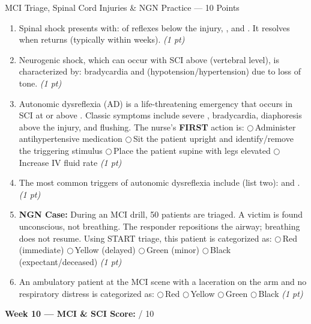 \documentclass[11pt,letterpaper]{article}
\newcommand{\blank}[1][3cm]{\underline{\hspace{#1}}}
\begin{document}
\begin{diagbox}{MCI Triage, Spinal Cord Injuries \& NGN Practice --- 10 Points}
\begin{enumerate}[leftmargin=1.5em, label=\textbf{\arabic*.},start=101]
  \item Spinal shock presents with: \blank[3cm] of reflexes below the injury,
        \blank[3cm], and \blank[3cm].  It resolves when
        \blank[4cm] returns (typically within weeks).
        \hfill\textit{(1 pt)}

  \item Neurogenic shock, which can occur with SCI above \blank[2cm] (vertebral level),
        is characterized by: bradycardia and \blank[3cm] (hypotension/hypertension)
        due to loss of \blank[4cm] tone.
        \hfill\textit{(1 pt)}

  \item Autonomic dysreflexia (AD) is a life-threatening emergency that occurs in SCI
        at or above \blank[2cm].  Classic symptoms include severe
        \blank[3cm], bradycardia, diaphoresis above the injury, and
        flushing.  The nurse's \textbf{FIRST} action is:
        $\bigcirc$\,Administer antihypertensive medication
        $\bigcirc$\,Sit the patient upright and identify/remove the triggering stimulus
        $\bigcirc$\,Place the patient supine with legs elevated
        $\bigcirc$\,Increase IV fluid rate
        \hfill\textit{(1 pt)}

  \item The most common triggers of autonomic dysreflexia include (list two):
        \blank[4cm] and \blank[4cm].
        \hfill\textit{(1 pt)}

  \item \textbf{NGN Case:} During an MCI drill, 50 patients are triaged.  A victim is found
        unconscious, not breathing.  The responder repositions the airway; breathing does
        not resume.  Using START triage, this patient is categorized as:
        $\bigcirc$\,Red (immediate)
        $\bigcirc$\,Yellow (delayed)
        $\bigcirc$\,Green (minor)
        $\bigcirc$\,Black (expectant/deceased)
        \hfill\textit{(1 pt)}

  \item An ambulatory patient at the MCI scene with a laceration on the arm and no
        respiratory distress is categorized as:
        $\bigcirc$\,Red
        $\bigcirc$\,Yellow
        $\bigcirc$\,Green
        $\bigcirc$\,Black
        \hfill\textit{(1 pt)}

\end{enumerate}

\vspace{0.3cm}
\textbf{Week 10 --- MCI \& SCI Score:} \blank[1cm] / 10
\end{diagbox}
\end{document}
